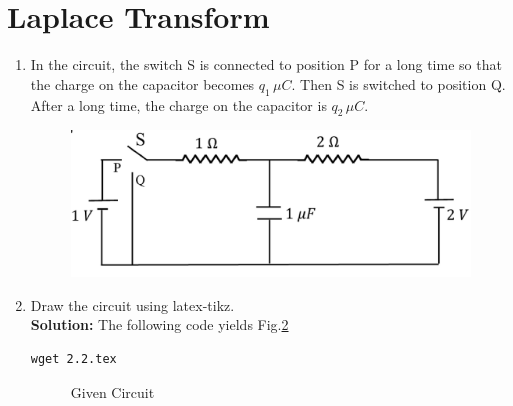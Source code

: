 \documentclass[journal,12pt,twocolumn]{IEEEtran}
\newcommand{\solution}{\noindent \textbf{Solution: }}
\numberwithin{equation}{section}
\renewcommand\thesection{\arabic{section}}
\begin{document}
 \section{Laplace Transform}
\begin{enumerate}[label=\arabic*.,ref=\thesection.\theenumi]
\item In the circuit, the switch S is connected to position P for a long time so that the charge on the capacitor
	becomes $q_1 \, \mu C$. Then S is switched to position Q.  After a long time, the charge on the capacitor is
		$q_2 \, \mu C$.
		\begin{figure}[!ht]
			\centering
			\includegraphics[width=\columnwidth]{figs/ckt.jpg}
			\caption{}
			\label{fig:ckt}
\end{figure}
\item Draw the circuit using latex-tikz.\\
\solution The following code yields Fig.\ref{fig:qn}
\begin{lstlisting}
wget 2.2.tex
\end{lstlisting}
\begin{figure}[!ht]
 \centering
  
\caption{Given Circuit}
\label{fig:qn}
\end{figure}


\end{enumerate}
\end{document}
